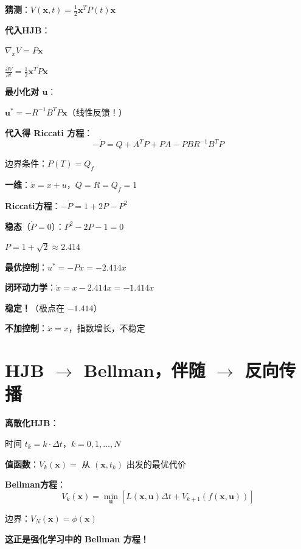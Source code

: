 \documentclass[12pt, a4paper]{ctexart}
\begin{document}
\begin{blackboard}[LQR的HJB解]

\textbf{猜测}：$V(\mathbf{x}, t) = \frac{1}{2}\mathbf{x}^T P(t) \mathbf{x}$

\textbf{代入HJB}：

$\nabla_x V = P\mathbf{x}$

$\frac{\partial V}{\partial t} = \frac{1}{2}\mathbf{x}^T \dot{P} \mathbf{x}$

\textbf{最小化对 $\mathbf{u}$}：

$\mathbf{u}^* = -R^{-1} B^T P \mathbf{x}$（线性反馈！）

\textbf{代入得 Riccati 方程}：
\[
-\dot{P} = Q + A^T P + PA - PBR^{-1}B^T P
\]

边界条件：$P(T) = Q_f$

\end{blackboard}

\begin{blackboard}[LQR数值例子]

\textbf{一维}：$\dot{x} = x + u$，$Q = R = Q_f = 1$

\textbf{Riccati方程}：$-\dot{P} = 1 + 2P - P^2$

\textbf{稳态}（$\dot{P} = 0$）：$P^2 - 2P - 1 = 0$

$P = 1 + \sqrt{2} \approx 2.414$

\textbf{最优控制}：$u^* = -Px = -2.414x$

\textbf{闭环动力学}：$\dot{x} = x - 2.414x = -1.414x$

\textbf{稳定！}（极点在 $-1.414$）

\textbf{不加控制}：$\dot{x} = x$，指数增长，不稳定

\end{blackboard}

\section{HJB $\to$ Bellman，伴随 $\to$ 反向传播}

\begin{blackboard}

\textbf{离散化HJB}：

时间 $t_k = k \cdot \Delta t$，$k = 0, 1, \ldots, N$

\textbf{值函数}：$V_k(\mathbf{x}) = $ 从 $(\mathbf{x}, t_k)$ 出发的最优代价

\textbf{Bellman方程}：
\[
\boxed{V_k(\mathbf{x}) = \min_{\mathbf{u}} \left[ L(\mathbf{x}, \mathbf{u}) \Delta t + V_{k+1}(f(\mathbf{x}, \mathbf{u})) \right]}
\]

边界：$V_N(\mathbf{x}) = \phi(\mathbf{x})$

\textbf{这正是强化学习中的 Bellman 方程！}

\end{blackboard}
\end{document}
